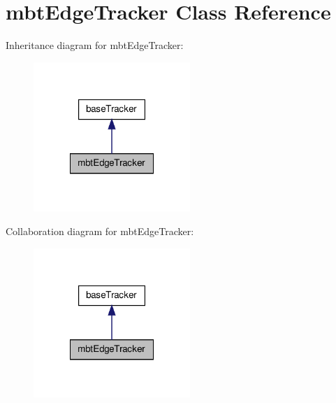 \hypertarget{classmbtEdgeTracker}{\section{mbt\-Edge\-Tracker \-Class \-Reference}
\label{classmbtEdgeTracker}
}


\-Inheritance diagram for mbt\-Edge\-Tracker\-:
\nopagebreak
\begin{figure}[H]
\begin{center}
\leavevmode
\includegraphics[width=168pt]{classmbtEdgeTracker__inherit__graph}
\end{center}
\end{figure}


\-Collaboration diagram for mbt\-Edge\-Tracker\-:
\nopagebreak
\begin{figure}[H]
\begin{center}
\leavevmode
\includegraphics[width=168pt]{classmbtEdgeTracker__coll__graph}
\end{center}
\end{figure}
